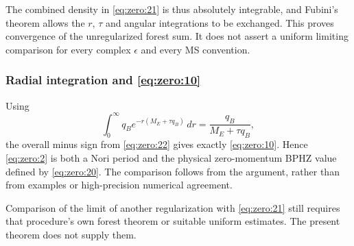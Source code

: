 \documentclass[11pt,a4paper,oneside]{article}
\theoremstyle{plain}
\theoremstyle{definition}
\theoremstyle{remark}
\numberwithin{equation}{section}
\begin{document}
The combined density in \eqref{eq:zero:21} is thus absolutely integrable, and Fubini's theorem allows the $r$, \(\tau\) and angular integrations to be exchanged. This proves convergence of the unregularized forest sum. It does not assert a uniform limiting comparison for every complex \(\epsilon\) and every MS convention.

\subsubsection{\texorpdfstring{Radial integration and \eqref{eq:zero:10}}{Radial integration}}\label{sec:zero:8.3}
Using
\begin{equation}
\int_0^\infty q_Be^{-r(M_E+\tau q_B)}\,dr
                           =\frac{q_B}{M_E+\tau q_B},         \label{eq:zero:25}
\end{equation}
the overall minus sign from \eqref{eq:zero:22} gives exactly \eqref{eq:zero:10}. Hence \eqref{eq:zero:2} is both a Nori period and the physical zero-momentum BPHZ value defined by \eqref{eq:zero:20}. The comparison follows from the argument, rather than from examples or high-precision numerical agreement.

Comparison of the limit of another regularization with \eqref{eq:zero:21} still requires that procedure's own forest theorem or suitable uniform estimates. The present theorem does not supply them.
\endgroup
\end{document}
